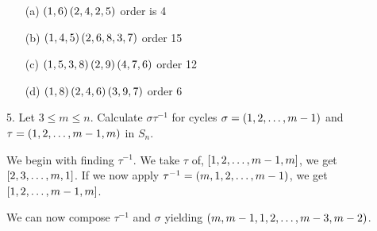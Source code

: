 \begin{mdframed}[style=darkAnswer,frametitle={Joe Starr}]
  \begin{itemize}
    \item [(a)] {
          $\left(1,6\right)\left(2,4,2,5\right)$
          order is 4
          }
    \item [(b)] {
          $\left(1,4,5\right)\left(2,6,8,3,7\right)$
          order 15
          }
    \item [(c)] {
          $\left(1,5,3,8\right)\left(2,9\right)\left(4,7,6\right)$
          order 12
          }
    \item [(d)] {
          $\left(1,8\right)\left(2,4,6\right)\left(3,9,7\right)$
          order 6
          }
  \end{itemize}
\end{mdframed}
\newpage
\begin{mdframed}[style=darkQuesion]
  5. Let $3\leq m\leq n$. Calculate $\sigma\tau^{-1}$ for cycles
  $\sigma= \left(1,2,\dots , m-1\right)$ and \\ $\tau= \left(1,2,\dots,m-1,m\right)$ in $S_n$.
\end{mdframed}

\begin{mdframed}[style=darkAnswer,frametitle={Joe Starr}]
  We begin with finding $\tau^{-1}$. We take $\tau$ of, $\left[1,2,\dots,m-1,m\right]$,
  we get $\left[2,3,\dots,m,1\right]$. If we now apply
  $\tau^{-1}=\left(m,1,2,\dots, m-1\right)$, we get $\left[1,2,\dots,m-1,m\right]$.

  We can now compose $\tau^{-1}$ and $\sigma$ yielding
  $\left(m,m-1,1,2,\dots,m-3,m-2\right)$.
\end{mdframed}
\newpage
